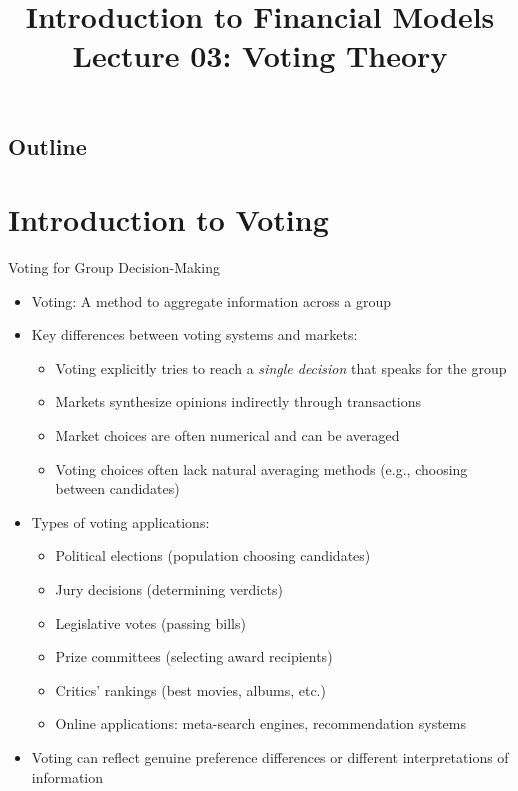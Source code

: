 \documentclass[10pt]{beamer}
\title{Introduction to Financial Models \\ Lecture 03: Voting Theory}
\author{}
\date{}
\begin{document}
\begin{frame}
\titlepage
\end{frame}

\subsection*{Outline}
\begin{frame}
  \tableofcontents
\end{frame}

\section{Introduction to Voting}

\begin{frame}{Voting for Group Decision-Making}
  \begin{itemize}[<+->]
    \item Voting: A method to aggregate information across a group
    \item Key differences between voting systems and markets:
      \begin{itemize}
        \item Voting explicitly tries to reach a \emph{single decision} that speaks for the group
        \item Markets synthesize opinions indirectly through transactions
        \item Market choices are often numerical and can be averaged
        \item Voting choices often lack natural averaging methods (e.g., choosing between candidates)
      \end{itemize}
    \item Types of voting applications:
      \begin{itemize}
        \item Political elections (population choosing candidates)
        \item Jury decisions (determining verdicts)
        \item Legislative votes (passing bills)
        \item Prize committees (selecting award recipients)
        \item Critics' rankings (best movies, albums, etc.)
        \item Online applications: meta-search engines, recommendation systems 
      \end{itemize}
    \item Voting can reflect genuine preference differences or different interpretations of information
  \end{itemize}
\end{frame}
\end{document}
